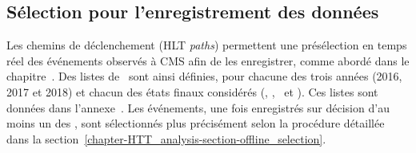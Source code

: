 \subsection{Sélection pour l'enregistrement des données}\label{chapter-HTT_analysis-section-triggers}
Les chemins de déclenchement (HLT \emph{paths}) permettent une présélection en temps réel des événements observés à CMS afin de les enregistrer, comme abordé dans le chapitre~.
Des listes de \HLTpaths\ sont ainsi définies, pour chacune des trois années (2016, 2017 et 2018) et chacun des états finaux considérés (\tauh\tauh, \mu\tauh, \ele\tauh\ et \ele\mu).
Ces listes sont données dans l'annexe~.
Les événements, une fois enregistrés sur décision d'au moins un des \HLTpaths, sont sélectionnés plus précisément selon la procédure détaillée dans la section~\ref{chapter-HTT_analysis-section-offline_selection}.

%
%

